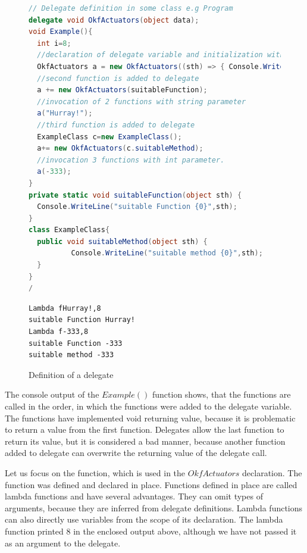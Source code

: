 \begin{figure}[!hbp]
\begin{lstlisting}[language=cs]
// Delegate definition in some class e.g Program
delegate void OkfActuators(object data);
void Example(){
  int i=8;
  //declaration of delegate variable and initialization with lambda function
  OkfActuators a = new OkfActuators((sth) => { Console.WriteLine("Lambda f{0},{1}",sth,i); });
  //second function is added to delegate
  a += new OkfActuators(suitableFunction);
  //invocation of 2 functions with string parameter
  a("Hurray!");
  //third function is added to delegate
  ExampleClass c=new ExampleClass();
  a+= new OkfActuators(c.suitableMethod);
  //invocation 3 functions with int parameter.
  a(-333);
}
private static void suitableFunction(object sth) { 
  Console.WriteLine("suitable Function {0}",sth);
}
class ExampleClass{
  public void suitableMethod(object sth) { 	
          Console.WriteLine("suitable method {0}",sth);	
  }
}
/\end{lstlisting}
\caption{Definition of a delegate} \label{deleg}

\begin{verbatim}
Lambda fHurray!,8
suitable Function Hurray!
Lambda f-333,8
suitable Function -333
suitable method -333
\end{verbatim}
\end{figure}
  The console output of the $Example()$ function shows, 
  that the functions are called in the order, 
  in  which the functions were added to the delegate variable. 
  The functions have implemented void returning value, 
  because it is problematic to return a value from the first function. 
  Delegates allow the last function to return its value, 
  but it is considered a bad manner, because
  another function added to delegate can overwrite the returning value of the delegate call.

  Let us focus on the function, which is used in the $OkfActuators$ declaration. The function 
  was defined and declared in place. Functions defined in place are called lambda functions 
  and have several advantages. 
  They can omit types of arguments, because they are inferred from delegate definitions. Lambda functions
  can also directly use variables from the scope of its declaration. 
  The lambda function printed $8$ in the enclosed output above,
  although we have not passed it as an argument to the delegate.

